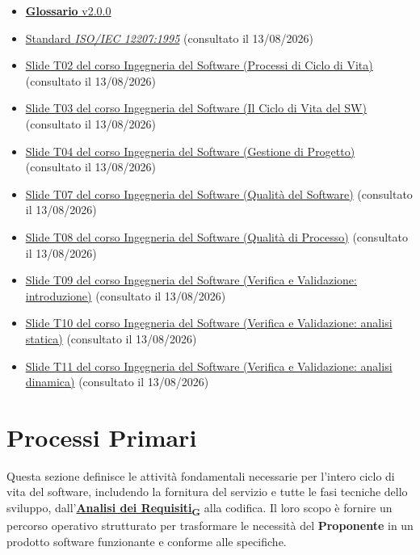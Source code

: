 \documentclass[12pt, a4paper]{article}
\newcommand{\urlglossario}{https://skynetunigroup.github.io/Code_Guardian/Documentazione/PB/glossario_v2.0.0.pdf} %
\newcommand{\glo}[2]{\href{\urlglossario\#nameddest=#2}{#1\textsubscript{G}}}
\begin{document}
\begin{itemize}
\item
 \href{https://skynetunigroup.github.io/Code_Guardian/Documentazione/PB/glossario_v2.0.0.pdf}{\textbf{Glossario} v2.0.0}
\item
  \href{https://www.math.unipd.it/~tullio/IS-1/2009/Approfondimenti/ISO_12207-1995.pdf}{Standard \textit{ISO/IEC 12207:1995}} (consultato il 13/08/2026)
\item
  \href{https://www.math.unipd.it/~tullio/IS-1/2025/Dispense/T02.pdf}{Slide T02 del corso Ingegneria del Software (Processi di Ciclo di Vita)} (consultato il 13/08/2026)
\item
  \href{https://www.math.unipd.it/~tullio/IS-1/2025/Dispense/T03.pdf}{Slide T03 del corso Ingegneria del Software (Il Ciclo di Vita del SW)} (consultato il 13/08/2026)
\item
  \href{https://www.math.unipd.it/~tullio/IS-1/2025/Dispense/T04.pdf}{Slide T04 del corso Ingegneria del Software (Gestione di Progetto)} (consultato il 13/08/2026)
\item
  \href{https://www.math.unipd.it/~tullio/IS-1/2025/Dispense/T07.pdf}{Slide T07 del corso Ingegneria del Software (Qualità del Software)} (consultato il 13/08/2026)
\item
  \href{https://www.math.unipd.it/~tullio/IS-1/2025/Dispense/T08.pdf}{Slide T08 del corso Ingegneria del Software (Qualità di Processo)} (consultato il 13/08/2026)
\item
  \href{https://www.math.unipd.it/~tullio/IS-1/2025/Dispense/T09.pdf}{Slide T09 del corso Ingegneria del Software (Verifica e Validazione: introduzione)} (consultato il 13/08/2026)
\item
  \href{https://www.math.unipd.it/~tullio/IS-1/2025/Dispense/T10.pdf}{Slide T10 del corso Ingegneria del Software (Verifica e Validazione: analisi statica)} (consultato il 13/08/2026)
\item
  \href{https://www.math.unipd.it/~tullio/IS-1/2025/Dispense/T11.pdf}{Slide T11 del corso Ingegneria del Software (Verifica e Validazione: analisi dinamica)} (consultato il 13/08/2026)
\end{itemize}

\newpage
\section{Processi Primari}
Questa sezione definisce le attività fondamentali necessarie per l'intero ciclo di vita del software, includendo la fornitura del servizio e tutte le fasi tecniche dello sviluppo, dall'\textbf{\glo{Analisi dei Requisiti}{analisi-dei-requisiti}} alla codifica. Il loro scopo è fornire un percorso operativo strutturato per trasformare le necessità del \textbf{Proponente} in un prodotto software funzionante e conforme alle specifiche.
\end{document}
